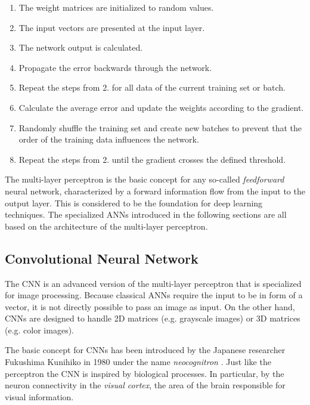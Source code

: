 \begin{enumerate}
    \item The weight matrices are initialized to random values.
    \item The input vectors are presented at the input layer.
    \item The network output is calculated.
    \item Propagate the error backwards through the network.
    \item Repeat the steps from 2. for all data of the current training set or batch.
    \item Calculate the average error and update the weights according to the gradient.
    \item Randomly shuffle the training set and create new batches to prevent that the order of the training data influences the network.
    \item Repeat the steps from 2. until the gradient crosses the defined threshold.
    \cite{nielsen2015neural}
    
\end{enumerate}

The multi-layer perceptron is the basic concept for any so-called \textit{feedforward} neural network, characterized by a forward information flow from the input to the output layer. This is considered to be the foundation for deep learning techniques. The specialized \acp{ANN} introduced in the following sections are all based on the architecture of the multi-layer perceptron.
\cite{nielsen2015neural}

\subsection{Convolutional Neural Network}
The \ac{CNN} is an advanced version of the multi-layer perceptron that is specialized for image processing. Because classical \acp{ANN} require the input to be in form of a vector, it is not directly possible to pass an image as input. On the other hand, \acp{CNN} are designed to handle 2D matrices (e.g. grayscale images) or 3D matrices (e.g. color images).
\cite{Goodfellow-et-al-2016}

The basic concept for \acp{CNN} has been introduced by the Japanese researcher Fukushima Kunihiko in 1980 under the name \textit{neocognitron} \cite{fukushima1980neocognitron}.
Just like the perceptron the \ac{CNN} is inspired by biological processes. In particular, by the neuron connectivity in the \textit{visual cortex}, the area of the brain responsible for visual information. 

